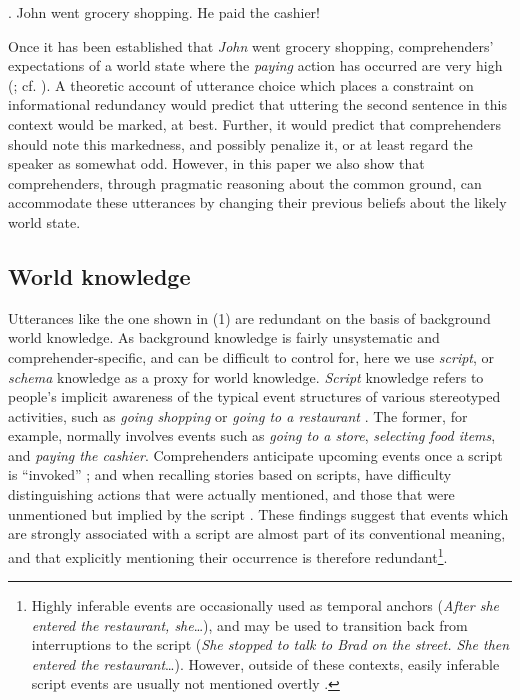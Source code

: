 \ex. John went grocery shopping. He paid the cashier!

Once it has been established that \emph{John} went grocery shopping,
comprehenders' expectations of a world state where the \emph{paying}
action has occurred are very high (\citealp{Bower1979}; cf.
\citealp{Zwaan1995}). A theoretic account of utterance
choice which places a constraint on informational redundancy would
predict that uttering the second sentence in this context would be
marked, at best. Further, it would predict that comprehenders should
note this markedness, and possibly penalize it, or at least regard the
speaker as somewhat odd. However, in this paper we also show that
comprehenders, through pragmatic reasoning about the common ground, can
accommodate these utterances by changing their previous beliefs about
the likely world state.

\subsection{World knowledge}\label{world-knowledge}

Utterances like the one shown in (1) are redundant on the basis of
background world knowledge. As background knowledge is fairly
unsystematic and comprehender-specific, and can be difficult to control
for, here we use \emph{script}, or \emph{schema} knowledge as a proxy
for world knowledge. \emph{Script} knowledge refers to people's implicit
awareness of the typical event structures of various stereotyped
activities, such as \emph{going shopping} or \emph{going to a
restaurant} \citep{Fillmore2006, Minsky1975, Schank1977}. The
former, for example, normally involves events such as \emph{going to a
store}, \emph{selecting food items}, and \emph{paying the cashier}.
Comprehenders anticipate upcoming events once a script is
\enquote{invoked} \citep{Zwaan1995}; and when recalling stories based
on scripts, have difficulty distinguishing actions that were actually
mentioned, and those that were unmentioned but implied by the script
\citep{Bower1979}. These findings suggest that events which are
strongly associated with a script are almost part of its conventional
meaning, and that explicitly mentioning their occurrence is therefore
redundant\footnote{Highly inferable events are occasionally used as
  temporal anchors (\emph{After she entered the restaurant,
  she}\ldots{}), and may be used to transition back from interruptions
  to the script (\emph{She stopped to talk to Brad on the street. She
  then entered the restaurant}\ldots{}). However, outside of these
  contexts, easily inferable script events are usually not mentioned
  overtly \citep{Bower1979, Regneri2010}.}.

